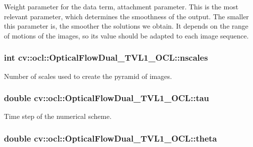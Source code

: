 Weight parameter for the data term, attachment parameter. This is the most relevant parameter, which determines the smoothness of the output. The smaller this parameter is, the smoother the solutions we obtain. It depends on the range of motions of the images, so its value should be adapted to each image sequence. \hypertarget{classcv_1_1ocl_1_1OpticalFlowDual__TVL1__OCL_a32d9f7085b3255a2850cc30c7ec9c478}{
\subsubsection[{nscales}]{\setlength{\rightskip}{0pt plus 5cm}int cv\-::ocl\-::\-Optical\-Flow\-Dual\-\_\-\-T\-V\-L1\-\_\-\-O\-C\-L\-::nscales}}\label{classcv_1_1ocl_1_1OpticalFlowDual__TVL1__OCL_a32d9f7085b3255a2850cc30c7ec9c478}
Number of scales used to create the pyramid of images. \hypertarget{classcv_1_1ocl_1_1OpticalFlowDual__TVL1__OCL_a1900469b6f73f1c667dd36618cc34eba}{
\subsubsection[{tau}]{\setlength{\rightskip}{0pt plus 5cm}double cv\-::ocl\-::\-Optical\-Flow\-Dual\-\_\-\-T\-V\-L1\-\_\-\-O\-C\-L\-::tau}}\label{classcv_1_1ocl_1_1OpticalFlowDual__TVL1__OCL_a1900469b6f73f1c667dd36618cc34eba}
Time step of the numerical scheme. \hypertarget{classcv_1_1ocl_1_1OpticalFlowDual__TVL1__OCL_a0e5e6edb24b48776693082cd65bd2464}{
\subsubsection[{theta}]{\setlength{\rightskip}{0pt plus 5cm}double cv\-::ocl\-::\-Optical\-Flow\-Dual\-\_\-\-T\-V\-L1\-\_\-\-O\-C\-L\-::theta}}\label{classcv_1_1ocl_1_1OpticalFlowDual__TVL1__OCL_a0e5e6edb24b48776693082cd65bd2464}
